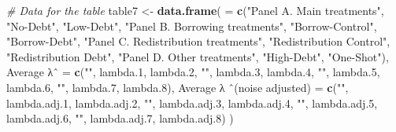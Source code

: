 \documentclass[
]{article}
\newenvironment{Shaded}{\begin{snugshade}}{\end{snugshade}}
\newcommand{\AttributeTok}[1]{\textcolor[rgb]{0.13,0.29,0.53}{#1}}
\newcommand{\CommentTok}[1]{\textcolor[rgb]{0.56,0.35,0.01}{\textit{#1}}}
\newcommand{\FloatTok}[1]{\textcolor[rgb]{0.00,0.00,0.81}{#1}}
\newcommand{\FunctionTok}[1]{\textcolor[rgb]{0.13,0.29,0.53}{\textbf{#1}}}
\newcommand{\NormalTok}[1]{#1}
\newcommand{\OtherTok}[1]{\textcolor[rgb]{0.56,0.35,0.01}{#1}}
\newcommand{\StringTok}[1]{\textcolor[rgb]{0.31,0.60,0.02}{#1}}
\begin{document}
\begin{Shaded}
\begin{Highlighting}[]
\CommentTok{\# Data for the table}
\NormalTok{table7 }\OtherTok{\textless{}{-}} \FunctionTok{data.frame}\NormalTok{(}
  \StringTok{\textasciigrave{}}\AttributeTok{ }\StringTok{\textasciigrave{}} \OtherTok{=} \FunctionTok{c}\NormalTok{(}\StringTok{"Panel A. Main treatments"}\NormalTok{, }\StringTok{"No{-}Debt"}\NormalTok{, }\StringTok{"Low{-}Debt"}\NormalTok{, }
          \StringTok{"Panel B. Borrowing treatments"}\NormalTok{, }\StringTok{"Borrow{-}Control"}\NormalTok{, }\StringTok{"Borrow{-}Debt"}\NormalTok{, }
          \StringTok{"Panel C. Redistribution treatments"}\NormalTok{, }\StringTok{"Redistribution Control"}\NormalTok{, }\StringTok{"Redistribution Debt"}\NormalTok{, }
          \StringTok{"Panel D. Other treatments"}\NormalTok{, }\StringTok{"High{-}Debt"}\NormalTok{, }\StringTok{"One{-}Shot"}\NormalTok{),}
  \StringTok{\textasciigrave{}}\AttributeTok{Average λˆ}\StringTok{\textasciigrave{}} \OtherTok{=} \FunctionTok{c}\NormalTok{(}\StringTok{""}\NormalTok{, lambda}\FloatTok{.1}\NormalTok{, lambda}\FloatTok{.2}\NormalTok{, }\StringTok{""}\NormalTok{, lambda}\FloatTok{.3}\NormalTok{, lambda}\FloatTok{.4}\NormalTok{, }\StringTok{""}\NormalTok{, lambda}\FloatTok{.5}\NormalTok{, lambda}\FloatTok{.6}\NormalTok{, }\StringTok{""}\NormalTok{, lambda}\FloatTok{.7}\NormalTok{, lambda}\FloatTok{.8}\NormalTok{),}
  \StringTok{\textasciigrave{}}\AttributeTok{Average λ ˆ(noise adjusted)}\StringTok{\textasciigrave{}} \OtherTok{=} \FunctionTok{c}\NormalTok{(}\StringTok{""}\NormalTok{, lambda.adj}\FloatTok{.1}\NormalTok{, lambda.adj}\FloatTok{.2}\NormalTok{, }\StringTok{""}\NormalTok{, lambda.adj}\FloatTok{.3}\NormalTok{, lambda.adj}\FloatTok{.4}\NormalTok{, }\StringTok{""}\NormalTok{, lambda.adj}\FloatTok{.5}\NormalTok{, lambda.adj}\FloatTok{.6}\NormalTok{, }\StringTok{""}\NormalTok{, lambda.adj}\FloatTok{.7}\NormalTok{, lambda.adj}\FloatTok{.8}\NormalTok{)}
\NormalTok{)}


\end{Highlighting}
\end{Shaded}
\end{document}
